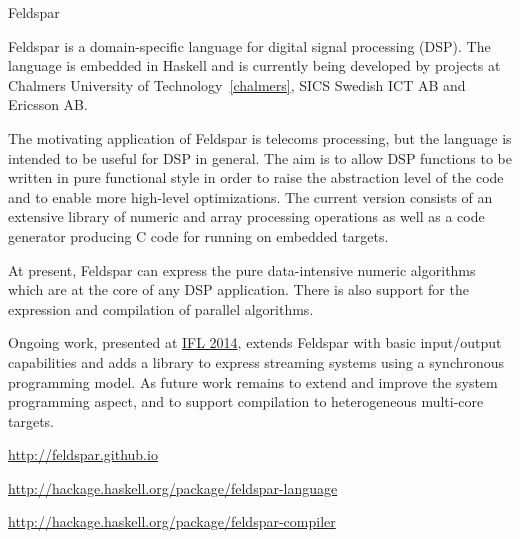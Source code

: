 \begin{hcarentry}{Feldspar}
\label{feldspar}
\makeheader

Feldspar is a domain-specific language for digital signal processing (DSP). The
language is embedded in Haskell and is currently being developed by projects at
Chalmers University of Technology~\cref{chalmers}, SICS Swedish ICT AB and
Ericsson AB.

The motivating application of Feldspar is telecoms processing, but the language
is intended to be useful for DSP in general. The aim is to allow DSP functions
to be written in pure functional style in order to raise the abstraction level of
the code and to enable more high-level optimizations. The current version consists
of an extensive library of numeric and array processing operations as well as a
code generator producing C code for running on embedded targets.

At present, Feldspar can express the pure data-intensive numeric algorithms
which are at the core of any DSP application. There is also support for the
expression and compilation of parallel algorithms.

Ongoing work, presented at \href{http://ifl2014.github.io/submissions/ifl2014_submission_23.pdf}{IFL 2014},
extends Feldspar with basic input/output capabilities and adds a library to
express streaming systems using a synchronous programming model. As future work
remains to extend and improve the system programming aspect, and to support
compilation to heterogeneous multi-core targets.

\FurtherReading
\begin{compactitem}
\item \url{http://feldspar.github.io}
\item \url{http://hackage.haskell.org/package/feldspar-language}
\item \url{http://hackage.haskell.org/package/feldspar-compiler}
\end{compactitem}
\end{hcarentry}
